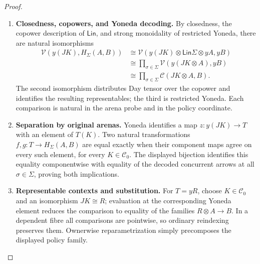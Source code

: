 \documentclass[11pt,a4paper]{article}
\numberwithin{equation}{section}
\theoremstyle{definition}
\theoremstyle{remark}
\theoremstyle{plain}
\providecommand{\Lin}{\mathsf{Lin}}
\providecommand{\cC}{\mathcal{C}}
\providecommand{\cV}{\mathcal{V}}
\begin{document}
\begin{proof}
\leavevmode
\begin{enumerate}[label=\textup{(\arabic*)},leftmargin=*,itemsep=4pt,topsep=3pt]
  \item \textbf{Closedness, copowers, and Yoneda decoding.} By closedness,
the copower description of $\Lin$, and strong monoidality of restricted
Yoneda, there are natural isomorphisms
\[
\begin{aligned}
 \cV(y(JK),H_\Sigma(A,B))
 &\cong\cV(y(JK)\otimes\Lin\Sigma\otimes yA,yB)\\
 &\cong\prod_{\sigma\in\Sigma}
             \cV(y(JK\otimes A),yB)\\
 &\cong\prod_{\sigma\in\Sigma}\cC(JK\otimes A,B).
\end{aligned}
\]
The second isomorphism distributes Day tensor over the copower and
identifies the resulting representables; the third is restricted Yoneda.
Each comparison is natural in the arena probe and in the policy
coordinate.
  \item \textbf{Separation by original arenas.} Yoneda identifies a map
$z:y(JK)\to T$ with an element of $T(K)$. Two natural transformations
$f,g:T\to H_\Sigma(A,B)$ are equal exactly when their component maps
agree on every such element, for every $K\in\cC_0$. The displayed
bijection identifies this equality componentwise with equality of the
decoded concurrent arrows at all $\sigma\in\Sigma$, proving both
implications.
  \item \textbf{Representable contexts and substitution.} For $T=yR$,
choose $K\in\cC_0$ and an isomorphism $JK\cong R$; evaluation at the
corresponding Yoneda element reduces the comparison to equality of the
families $R\otimes A\to B$. In a dependent fibre all comparisons
are pointwise, so ordinary reindexing preserves them. Ownerwise
reparametrization simply precomposes the displayed policy family.
\end{enumerate}
\end{proof}
\end{document}
